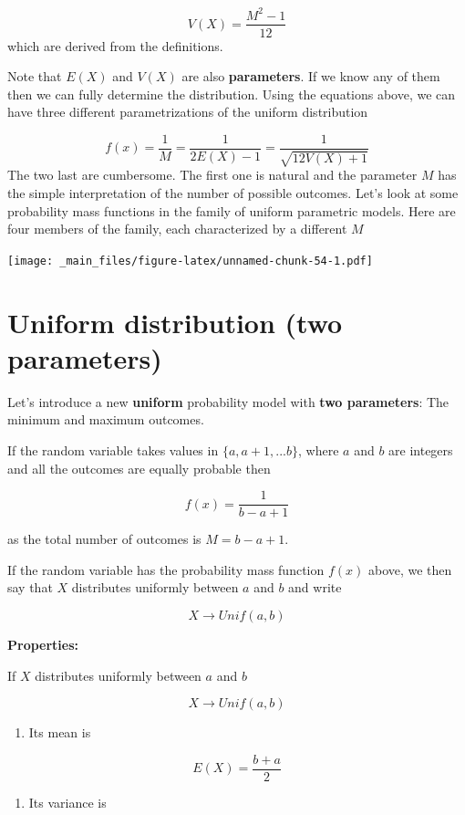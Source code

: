 \documentclass[
]{book}
\providecommand{\tightlist}{%
  \setlength{\itemsep}{0pt}\setlength{\parskip}{0pt}}
\begin{document}
\[V(X)= \frac{M^2-1}{12}\]
which are derived from the definitions.

Note that \(E(X)\) and \(V(X)\) are also \textbf{parameters}. If we know any of them then we can fully determine the distribution. Using the equations above, we can have three different parametrizations of the uniform distribution

\[f(x)=\frac{1}{M}=\frac{1}{2E(X)-1}=\frac{1}{\sqrt{12V(X)+1}}\]
The two last are cumbersome. The first one is natural and the parameter \(M\) has the simple interpretation of the number of possible outcomes. Let's look at some probability mass functions in the family of uniform parametric models. Here are four members of the family, each characterized by a different \(M\)

\texttt{[image: \_main\_files/figure-latex/unnamed-chunk-54-1.pdf]}

\hypertarget{uniform-distribution-two-parameters}{%
\section{Uniform distribution (two parameters)}\label{uniform-distribution-two-parameters}}

Let's introduce a new \textbf{uniform} probability model with \textbf{two parameters}: The minimum and maximum outcomes.

If the random variable takes values in \(\{a, a+1, ...b\}\), where \(a\) and \(b\) are integers and all the outcomes are equally probable then

\[f(x)=\frac{1}{b-a+1}\]

as the total number of outcomes is \(M=b-a+1\).

If the random variable has the probability mass function \(f(x)\) above, we then say that \(X\) distributes uniformly between \(a\) and \(b\) and write

\[X \rightarrow Unif(a,b)\]

\textbf{Properties:}

If \(X\) distributes uniformly between \(a\) and \(b\)

\[X \rightarrow Unif(a,b)\]

\begin{enumerate}
\def\labelenumi{\arabic{enumi})}
\tightlist
\item
  Its mean is
\end{enumerate}

\[E(X)= \frac{b+a}{2}\]

\begin{enumerate}
\def\labelenumi{\arabic{enumi})}
\setcounter{enumi}{1}
\tightlist
\item
  Its variance is
\end{enumerate}
\end{document}
